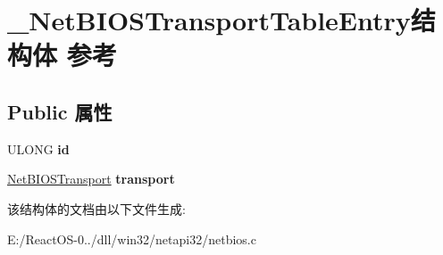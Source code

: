 \hypertarget{struct___net_b_i_o_s_transport_table_entry}{}\section{\+\_\+\+Net\+B\+I\+O\+S\+Transport\+Table\+Entry结构体 参考}
\label{struct___net_b_i_o_s_transport_table_entry}
\subsection*{Public 属性}
\begin{DoxyCompactItemize}
\item 
\mbox{\label{struct___net_b_i_o_s_transport_table_entry_a3d5d46f846fe81a6667140d166beafe1}} 
U\+L\+O\+NG {\bfseries id}
\item 
\mbox{\label{struct___net_b_i_o_s_transport_table_entry_a38a9decf886ed700b7caeaf61efa6470}} 
\hyperlink{struct___net_b_i_o_s_transport}{Net\+B\+I\+O\+S\+Transport} {\bfseries transport}
\end{DoxyCompactItemize}


该结构体的文档由以下文件生成\+:\begin{DoxyCompactItemize}
\item 
E\+:/\+React\+O\+S-\/0../dll/win32/netapi32/netbios.\+c\end{DoxyCompactItemize}
